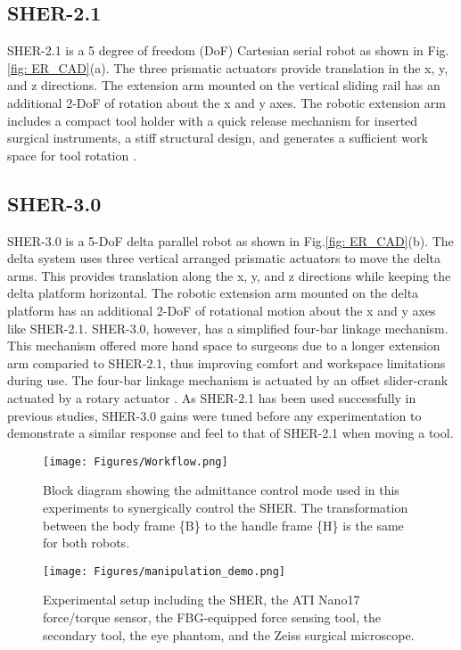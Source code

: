\documentclass[letterpaper, 10 pt, conference]{ieeeconf}  %
\begin{document}
\subsection{SHER-2.1}

SHER-2.1 is a 5 degree of freedom (DoF) Cartesian serial robot as shown in Fig.\ref{fig: ER_CAD}(a). The three prismatic actuators provide translation in the x, y, and z directions. The extension arm mounted on the vertical sliding rail has an additional 2-DoF of rotation about the x and y axes. The robotic extension arm includes a compact tool holder with a quick release mechanism for inserted surgical instruments, a stiff structural design, and generates a sufficient work space for tool rotation \cite{he2012toward}.

\subsection{SHER-3.0}

SHER-3.0 is a 5-DoF delta parallel robot as shown in Fig.\ref{fig: ER_CAD}(b). The delta system uses three vertical arranged prismatic actuators to move the delta arms. This provides translation along the x, y, and z directions while keeping the delta platform horizontal. The robotic extension arm mounted on the delta platform has an additional 2-DoF of rotational motion about the x and y axes like SHER-2.1. SHER-3.0, however, has a simplified four-bar linkage mechanism. This mechanism offered more hand space to surgeons due to a longer extension arm comparied to SHER-2.1, thus improving comfort and workspace limitations during use. The four-bar linkage mechanism is actuated by an offset slider-crank actuated by a rotary actuator \cite{roth2021towards}. As SHER-2.1 has been used successfully in previous studies, SHER-3.0 gains were tuned before any experimentation to demonstrate a similar response and feel to that of SHER-2.1 when moving a tool.

\begin{figure*}[t!]
  \centering
    \texttt{[image: Figures/Workflow.png]}
      \caption{Block diagram showing the admittance control mode used in this experiments to synergically control the SHER. The transformation between the body frame \{B\} to the handle frame \{H\} is the same for both robots.}
      \label{fig: Workflow}
\end{figure*}
\begin{figure}[!b]
  \centering
    \texttt{[image: Figures/manipulation\_demo.png]}
      \caption{Experimental setup including the SHER, the ATI Nano17 force/torque sensor, the FBG-equipped force sensing tool, the secondary tool, the eye phantom, and the Zeiss surgical microscope.}
      \label{fig: manipulation}
\end{figure}
\end{document}
